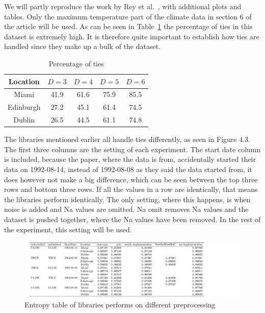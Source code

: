 We will partly reproduce the work by Rey et al.~\cite{Rey2023}, with additional plots and tables. 
Only the maximum temperature part of the climate data in section 6 of the article will be used. As can be seen in Table~\ref{tab:TiesPercentages} the percentage of ties in this dataset is extremely high. 
It is therefore quite important to establish how ties are handled since they make up a bulk of the dataset. 

\begin{table}[hbt]
\centering
\begin{tabular}{*5{c}}
\toprule
Location & $D=3$ & $D=4$ & $D=5$ & $D=6$\\ \midrule
Miami & 41.9 & 61.6 & 75.9 & 85.5\\
Edinburgh & 27.2 & 45.1 & 61.4 & 74.5 \\
Dublin & 26.5 & 44.5 & 61.1 & 74.8\\ \bottomrule
\end{tabular}
    \caption{Percentage of ties}\label{tab:TiesPercentages}
\end{table}

The libraries mentioned earlier all handle ties differently, as seen in Figure 4.3. The first three columns are the setting of each experiment. The start date column is included, because the paper, where the data is from, accidentally started their data on 1992-08-14, instead of 1992-08-08 as they said the data started from, it does however not make a big difference, which can be seen between the top three rows and bottom three rows.  If all the values in a row are identically, that means the libraries perform identically. The only setting, where this happens, is when noise is added and Na values are omitted. Na omit removes Na values and the dataset is pushed together, where the Na values have been removed. In the rest of the experiment, this setting will be used. 

\begin{figure}
    \centering
    \includegraphics[width=\textwidth,keepaspectratio]{./Weather/entropyTable.pdf}
    \caption{Entropy table of libraries performs on different preprocessing}
\end{figure}


